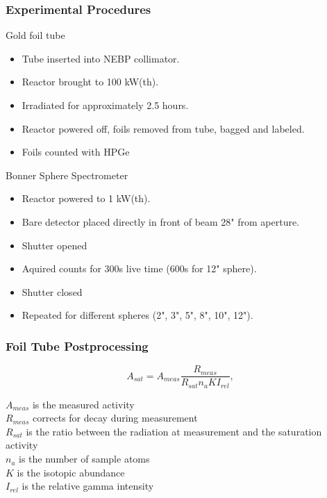 \documentclass[fleqn]{beamer}
\begin{document}
\begin{frame}
\frametitle{Experimental Procedures}

Gold foil tube
\begin{itemize}
\item Tube inserted into NEBP collimator.
\item Reactor brought to 100 kW(th).
\item Irradiated for approximately 2.5 hours.
\item Reactor powered off, foils removed from tube, bagged and labeled.
\item Foils counted with HPGe
\end{itemize}

Bonner Sphere Spectrometer
\begin{itemize}
\item Reactor powered to 1 kW(th).
\item Bare detector placed directly in front of beam 28" from aperture.
\item Shutter opened
\item Aquired counts for 300s live time (600s for 12" sphere).
\item Shutter closed
\item Repeated for different spheres (2", 3", 5", 8", 10", 12").
\end{itemize}
\end{frame}

\begin{frame}
\frametitle{Foil Tube Postprocessing}

\begin{equation}
\label{eqn:a_sat}
A_{sat} = A_{meas} \frac{R_{meas}}{R_{sat} n_a K I_{rel}} ,
\end{equation}

$A_{meas}$ is the measured activity\\
$R_{meas}$ corrects for decay during measurement\\
$R_{sat}$ is the ratio between the radiation at measurement and the saturation activity\\
$n_a$ is the number of sample atoms\\
$K$ is the isotopic abundance\\
$I_{rel}$ is the relative gamma intensity\\

\end{frame}
\end{document}
